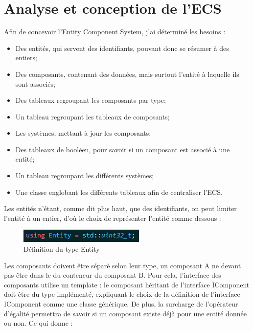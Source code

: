 \documentclass[12pt, openany]{report}
\begin{document}
\section{Analyse et conception de l'ECS}
Afin de concevoir l'Entity Component System, j'ai d\'etermin\'e les besoins :
\begin{itemize}
\item Des entités, qui servent des identifiants, pouvant donc se r\'esumer \`a des entiers;
\item Des composants, contenant des donn\'ees, mais surtout l'entité \`a laquelle ils sont associ\'es;
\item Des tableaux regroupant les composants par type;
\item Un tableau regroupant les tableaux de composants;
\item Les syst\`emes, mettant \`a jour les composants;
\item Des tableaux de bool\'een, pour savoir si un composant est associ\'e \`a une entit\'e;
\item Un tableau regroupant les diff\'erents syst\`emes;
\item Une classe englobant les diff\'erents tableaux afin de centraliser l'ECS.
\end{itemize}
Les entit\'es n'\'etant, comme dit plus haut, que des identifiants, on peut limiter l'entit\'e \`a un entier, d'o\`u le choix de repr\'esenter l'entit\'e comme dessous : 
\begin{figure}[!h]
\centering
\includegraphics[scale=1]{entity.png}
\caption{D\'efinition du type Entity}
\end{figure}
\par Les composants doivent \^etre s\'epar\'e selon leur type, un composant A ne devant pas \^etre dans le du conteneur du composant B. Pour cela, l'interface des composants utilise un template : le composant h\'eritant de l'interface IComponent doit \^etre du type impl\'ement\'e, expliquant le choix de la d\'efinition de l'interface IComponent comme une classe g\'en\'erique. De plus, la surcharge de l'op\'erateur d'\'egalit\'e permettra de savoir si un composant existe d\'ej\`a pour une entit\'e donn\'ee ou non. Ce qui donne :
\end{document}

